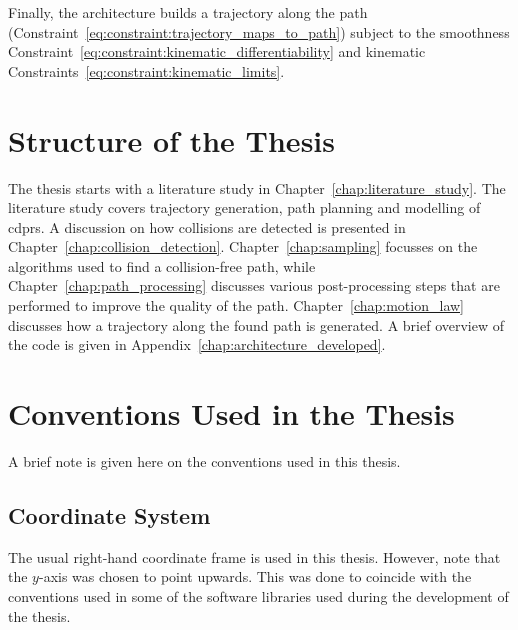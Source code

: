 		Finally, the architecture builds a trajectory along the path
		(Constraint~\ref{eq:constraint:trajectory_maps_to_path}) subject to the
		smoothness Constraint~\ref{eq:constraint:kinematic_differentiability}
		and kinematic Constraints~\ref{eq:constraint:kinematic_limits}.

	\section{Structure of the Thesis}

		The thesis starts with a literature study in
		Chapter~\ref{chap:literature_study}. The literature study covers
		trajectory generation, path planning and modelling of \glspl{cdpr}.  A
		discussion on how collisions are detected is presented in
		Chapter~\ref{chap:collision_detection}. Chapter~\ref{chap:sampling}
		focusses on the algorithms used to find a collision-free path, while
		Chapter~\ref{chap:path_processing} discusses various post-processing
		steps that are performed to improve the quality of the path.
		Chapter~\ref{chap:motion_law} discusses how a trajectory along the found
		path is generated. A brief overview of the code is given in
		Appendix~\ref{chap:architecture_developed}.

	\section{Conventions Used in the Thesis}

		A brief note is given here on the conventions used in this thesis.

		\subsection{Coordinate System}

			The usual right-hand coordinate frame is used in this thesis.
			However, note that the $y$-axis was chosen to point upwards. This
			was done to coincide with the conventions used in some of the
			software libraries used during the development of the thesis.
